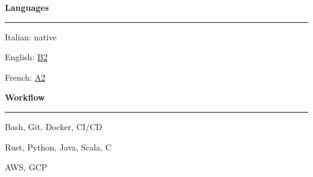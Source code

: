 \documentclass[11pt,letterpaper]{article}
\begin{document}
\begin{justify}
\begin{multicols}{3}
\begin{itemize}[label={}, itemsep=-5pt, leftmargin=0pt]
            \end{itemize}
            \vspace*{\fill}
            \columnbreak
            \textbf{Languages}\strut
            \hrule
            \begin{itemize}[label={}, itemsep=-5pt, leftmargin=0pt]
                  \begin{item}
                        Italian: native
                  \end{item}
                  \begin{item}
                        English:
                        \href{https://dariocurr.github.io/assets/doc/B2_english.pdf}{B2}
                  \end{item}
                  \begin{item}
                        French:
                        \href{https://dariocurr.github.io/assets/doc/A2_french.pdf}{A2}
                  \end{item}
            \end{itemize}
            \vspace*{\fill}
            \columnbreak
            \textbf{Workflow}\strut
            \hrule
            \begin{itemize}[label={}, itemsep=-5pt, leftmargin=0pt]
                  \begin{item}
                        Bash, Git, Docker, CI/CD
                  \end{item}
                  \begin{item}
                        Rust, Python, Java, Scala, C
                  \end{item}
                  \begin{item}
                        AWS, GCP
                  \end{item}
            \end{itemize}
            \vspace*{\fill}
      \end{multicols}
\end{justify}
\end{document}
